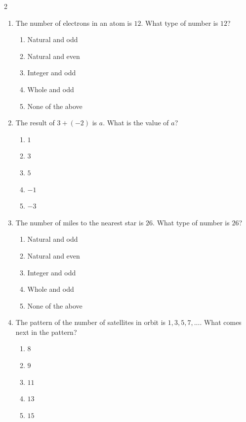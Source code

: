 \documentclass[10pt]{article}
\begin{document}
\begin{multicols}{2}
\begin{enumerate}[label=\textbf{Q\arabic*.}, leftmargin=*, itemsep=6pt, parsep=0pt]
  \item \small The number of electrons in an atom is $12$. What type of number is $12$?
  \begin{enumerate}[label=(\Alph*), leftmargin=0.6cm, nosep, itemsep=2pt]
    \item Natural and odd
    \item Natural and even
    \item Integer and odd
    \item Whole and odd
    \item None of the above
  \end{enumerate}

  \item \small The result of $3 + (-2)$ is $a$. What is the value of $a$?
  \begin{enumerate}[label=(\Alph*), leftmargin=0.6cm, nosep, itemsep=2pt]
    \item $1$
    \item $3$
    \item $5$
    \item $-1$
    \item $-3$
  \end{enumerate}

  \item \small The number of miles to the nearest star is $26$. What type of number is $26$?
  \begin{enumerate}[label=(\Alph*), leftmargin=0.6cm, nosep, itemsep=2pt]
    \item Natural and odd
    \item Natural and even
    \item Integer and odd
    \item Whole and odd
    \item None of the above
  \end{enumerate}

  \item \small The pattern of the number of satellites in orbit is $1, 3, 5, 7, ...$. What comes next in the pattern?
  \begin{enumerate}[label=(\Alph*), leftmargin=0.6cm, nosep, itemsep=2pt]
    \item $8$
    \item $9$
    \item $11$
    \item $13$
    \item $15$
  \end{enumerate}


\end{enumerate}
\end{multicols}
\end{document}
